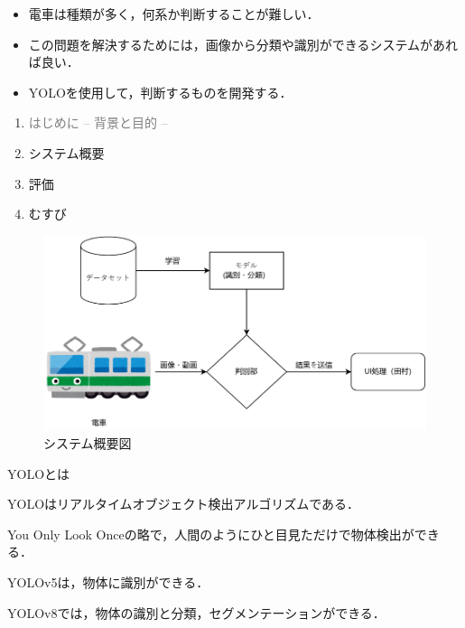 \begin{itemize}
	\item 電車は種類が多く，何系か判断することが難しい．
	\item この問題を解決するためには，画像から分類や識別ができるシステムがあれば良い．
	\item YOLOを使用して，判断するものを開発する．
\end{itemize}
\begin{enumerate}[itemsep=0.25\zh]
	\item \textcolor{gray}{はじめに -- 背景と目的 --}
	\item システム概要
	\item 評価
	\item むすび
\end{enumerate}
\newpage



\begin{figure}[h]
\begin{center}
\includegraphics[scale = 1.3]{fig/system_2.drawio.pdf}
\caption{システム概要図}
\end{center}
\end{figure}
\newpage

{\Large YOLOとは}
\begin{description}
	\item YOLOはリアルタイムオブジェクト検出アルゴリズムである．
	\item You Only Look Onceの略で，人間のようにひと目見ただけで物体検出ができる．
	\item YOLOv5は，物体に識別ができる．
	\item YOLOv8では，物体の識別と分類，セグメンテーションができる．
	\newpage
\end{description}
	
